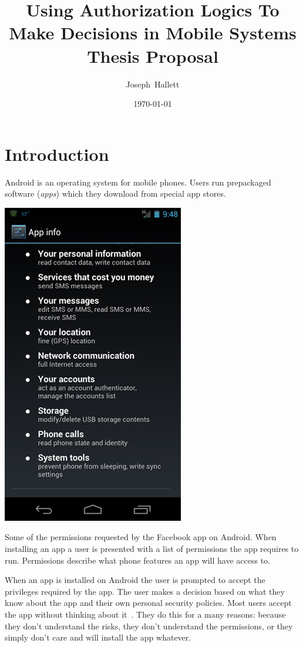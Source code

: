 \documentclass[a4paper]{article}
\title{Using Authorization Logics To Make Decisions in Mobile Systems\\\vspace{2em}Thesis Proposal}
\author{Joseph~Hallett}
\date\today
\begin{document}
\maketitle
\setcounter{tocdepth}{3}
\tableofcontents
\pagebreak

\section{Introduction}

Android is an operating system for mobile phones.  Users run prepackaged
software (\emph{apps}) which they download from special app stores.

\begin{marginfigure}
  \includegraphics[width=\marginlength]{img/facebookperms.jpeg}
  \caption{Some of the permissions requested by the Facebook app on Android.
  When installing an app a user is presented with a list of permissions the app
requires to run.  Permissions describe what phone features an app will have
access to.}
  \label{fig:fb}
\end{marginfigure}

When an app is installed on Android the user is prompted to accept the
privileges required by the app.  The user makes a decision based on what they
know about the app and their own personal security policies.  Most users accept
the app without thinking about it~\cite{Felt:2012hm}.  They do this for a many
reasons: because they don't understand the risks, they don't understand the
permissions, or they simply don't care and will install the app whatever.
\end{document}
